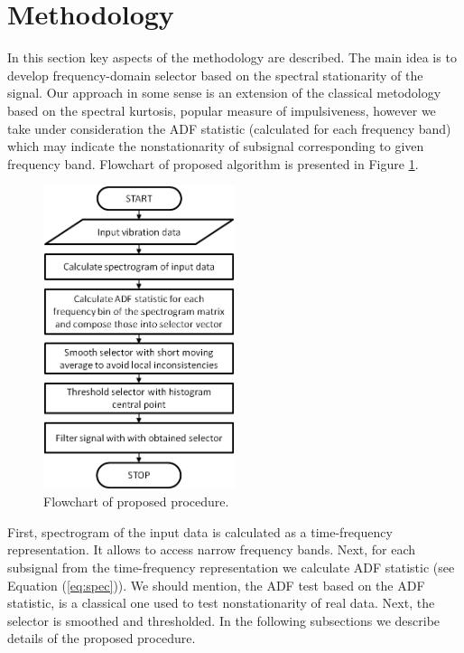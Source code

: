 \documentclass[11pt]{article}
\begin{document}
\section{Methodology}

In this section key aspects of the methodology are described. The main idea is to develop frequency-domain selector based on the spectral stationarity of the signal. Our approach in some sense is an extension of the classical metodology based on the spectral kurtosis, popular measure of impulsiveness, however we take under consideration the ADF statistic (calculated for each frequency band) which may indicate the nonstationarity of subsignal corresponding to given frequency band.  Flowchart of proposed algorithm is presented in Figure \ref{f:block}.

\begin{figure}[!ht]
\begin{center}
\includegraphics[width=0.5\textwidth]{block}
\caption{Flowchart of proposed procedure. \label{f:block}}
\end{center}
\end{figure}

First, spectrogram of the input data is calculated as a time-frequency representation. It allows to access narrow frequency bands. Next, for each subsignal from the time-frequency representation we calculate ADF statistic  (see Equation (\ref{eq:spec})). We should mention, the ADF test based on the ADF statistic,  is a classical one used to test nonstationarity of real data. Next, the selector is smoothed and thresholded.  In the following subsections we describe details of the proposed procedure.
\end{document}
